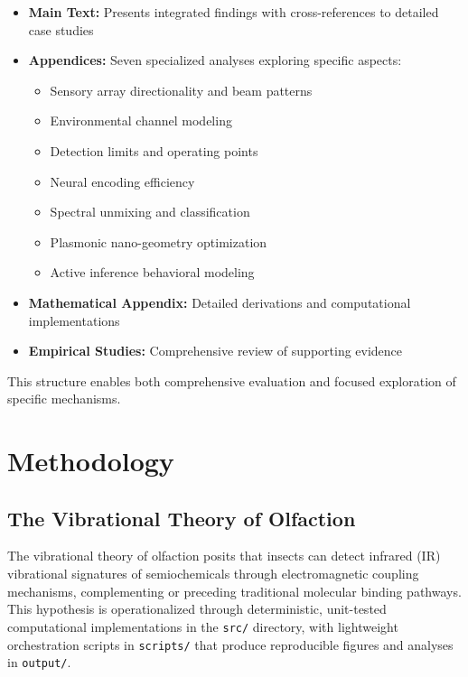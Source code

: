 \documentclass[
  13pt,
  a4paperpaper,
  12pt]{article}
\newcommand{\passthrough}[1]{#1}
\providecommand{\tightlist}{%
  \setlength{\itemsep}{0pt}\setlength{\parskip}{0pt}}
\let\oldsection\section
\renewcommand{\section}{\clearpage\oldsection}
\begin{document}
\begin{itemize}
\item
  \textbf{Main Text:} Presents integrated findings with cross-references
  to detailed case studies
\item
  \textbf{Appendices:} Seven specialized analyses exploring specific
  aspects:

  \begin{itemize}
  \tightlist
  \item
    Sensory array directionality and beam patterns
  \item
    Environmental channel modeling 
  \item
    Detection limits and operating points
  \item
    Neural encoding efficiency 
  \item
    Spectral unmixing and classification
  \item
    Plasmonic nano-geometry optimization
  \item
    Active inference behavioral modeling 
  \end{itemize}
\item
  \textbf{Mathematical Appendix:} Detailed derivations and computational
  implementations 
\item
  \textbf{Empirical Studies:} Comprehensive review of supporting
  evidence 
\end{itemize}

This structure enables both comprehensive evaluation and focused
exploration of specific mechanisms.

\section{Methodology}\label{sec:methodology}

\subsection{The Vibrational Theory of
Olfaction}\label{the-vibrational-theory-of-olfaction}

The vibrational theory of olfaction posits that insects can detect
infrared (IR) vibrational signatures of semiochemicals through
electromagnetic coupling mechanisms, complementing or preceding
traditional molecular binding pathways. This hypothesis is
operationalized through deterministic, unit-tested computational
implementations in the \passthrough{\lstinline!src/!} directory, with
lightweight orchestration scripts in \passthrough{\lstinline!scripts/!}
that produce reproducible figures and analyses in
\passthrough{\lstinline!output/!}.
\end{document}
